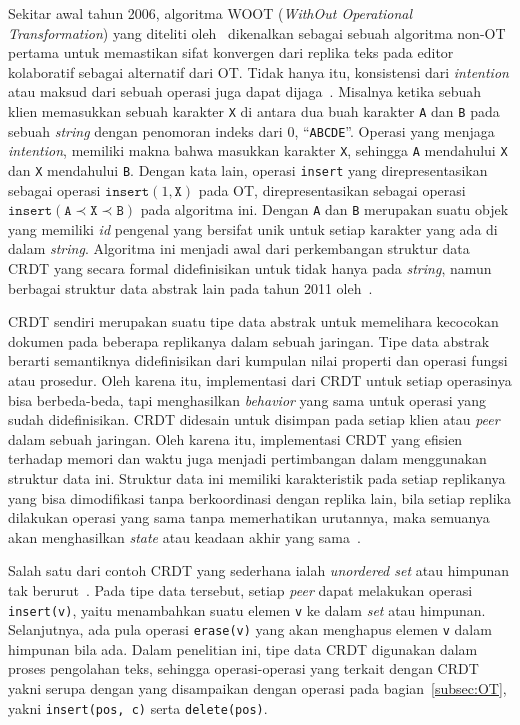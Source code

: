 Sekitar awal tahun 2006, algoritma WOOT (\textit{WithOut Operational Transformation}) yang diteliti oleh~\cite{oster2005real} dikenalkan sebagai sebuah algoritma non-OT pertama untuk memastikan sifat konvergen dari replika teks pada editor kolaboratif sebagai alternatif dari OT. Tidak hanya itu, konsistensi dari \textit{intention} atau maksud dari sebuah operasi juga dapat dijaga~\citep{Li2004}. Misalnya ketika sebuah klien memasukkan sebuah karakter \texttt{X} di antara dua buah karakter \texttt{A} dan \texttt{B} pada sebuah \textit{string} dengan penomoran indeks dari $0$, ``\texttt{ABCDE}''. Operasi yang menjaga \textit{intention}, memiliki makna bahwa masukkan karakter \texttt{X}, sehingga \texttt{A} mendahului \texttt{X} dan \texttt{X} mendahului \texttt{B}. Dengan kata lain, operasi \texttt{insert} yang direpresentasikan sebagai operasi $\texttt{insert}(1, \texttt{X})$ pada OT, direpresentasikan sebagai operasi $\texttt{insert}(\texttt{A} \prec \texttt{X} \prec \texttt{B})$ pada algoritma ini. Dengan \texttt{A} dan \texttt{B} merupakan suatu objek yang memiliki \textit{id} pengenal yang bersifat unik untuk setiap karakter yang ada di dalam \textit{string}. Algoritma ini menjadi awal dari perkembangan struktur data CRDT yang secara formal didefinisikan untuk tidak hanya pada \textit{string}, namun berbagai struktur data abstrak lain pada tahun 2011 oleh~\cite{Shapiro2011}.

CRDT sendiri merupakan suatu tipe data abstrak untuk memelihara kecocokan dokumen pada beberapa replikanya dalam sebuah jaringan. Tipe data abstrak berarti semantiknya didefinisikan dari kumpulan nilai properti dan operasi fungsi atau prosedur. Oleh karena itu, implementasi dari CRDT untuk setiap operasinya bisa berbeda-beda, tapi menghasilkan \textit{behavior} yang sama untuk operasi yang sudah didefinisikan. CRDT didesain untuk disimpan pada setiap klien atau \textit{peer} dalam sebuah jaringan. Oleh karena itu, implementasi CRDT yang efisien terhadap memori dan waktu juga menjadi pertimbangan dalam menggunakan struktur data ini. Struktur data ini memiliki karakteristik pada setiap replikanya yang bisa dimodifikasi tanpa berkoordinasi dengan replika lain, bila setiap replika dilakukan operasi yang sama tanpa memerhatikan urutannya, maka semuanya akan menghasilkan \textit{state} atau keadaan akhir yang sama~\citep{Shapiro2011, CRDToverview2}.

Salah satu dari contoh CRDT yang sederhana ialah \textit{unordered set} atau himpunan tak berurut~\citep{Shapiro2011}. Pada tipe data tersebut, setiap \textit{peer} dapat melakukan operasi \texttt{insert(v)}, yaitu menambahkan suatu elemen \texttt{v} ke dalam \textit{set} atau himpunan. Selanjutnya, ada pula operasi \texttt{erase(v)} yang akan menghapus elemen \texttt{v} dalam himpunan bila ada. Dalam penelitian ini, tipe data CRDT digunakan dalam proses pengolahan teks, sehingga operasi-operasi yang terkait dengan CRDT yakni serupa dengan yang disampaikan dengan operasi pada bagian~\ref{subsec:OT}, yakni \texttt{insert(pos, c)} serta \texttt{delete(pos)}.

